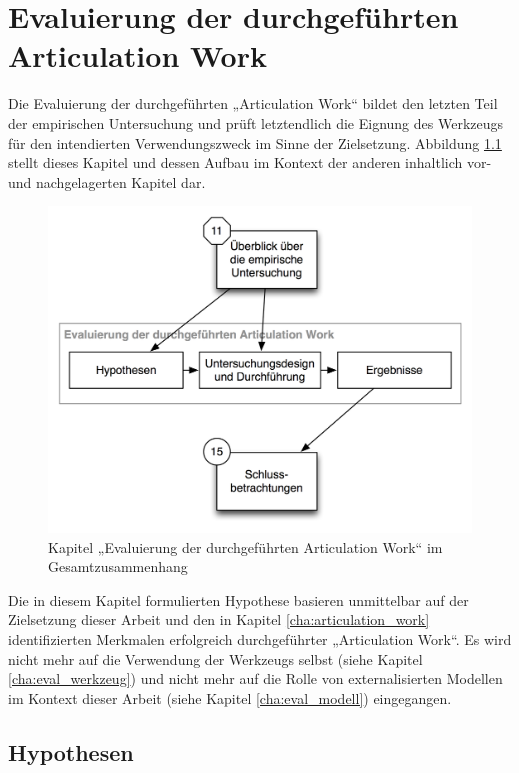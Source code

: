 \chapter{Evaluierung der durchgeführten Articulation Work} %
\label{cha:eval_aw}

Die Evaluierung der durchgeführten „Articulation Work“ bildet den letzten Teil der empirischen Untersuchung und prüft  letztendlich die Eignung des Werkzeugs für den intendierten Verwendungszweck im Sinne der Zielsetzung. Abbildung \ref{fig:img_Kontextgrafiken_k14} stellt dieses Kapitel und dessen Aufbau im Kontext der anderen inhaltlich vor- und nachgelagerten Kapitel dar.


\begin{figure}[htbp]
	\centering
		\includegraphics[scale=0.6]{img/Kontextgrafiken/k14.png}
	\caption{Kapitel „Evaluierung der durchgeführten Articulation Work“ im Gesamtzusammenhang}
	\label{fig:img_Kontextgrafiken_k14}
\end{figure}


Die in diesem Kapitel formulierten Hypothese basieren unmittelbar auf der Zielsetzung dieser Arbeit und den in Kapitel \ref{cha:articulation_work} identifizierten Merkmalen erfolgreich durchgeführter „Articulation Work“. Es wird nicht mehr auf die Verwendung der Werkzeugs selbst (siehe Kapitel \ref{cha:eval_werkzeug}) und nicht mehr auf die Rolle von externalisierten Modellen im Kontext dieser Arbeit (siehe Kapitel \ref{cha:eval_modell}) eingegangen.

\section{Hypothesen} %
\label{sec:a_hypothesen}

